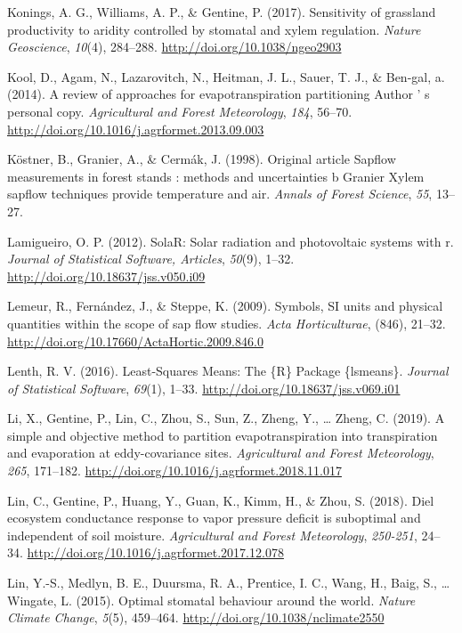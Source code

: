 \documentclass[11pt,twoside]{reedthesis}
\begin{document}
\hypertarget{ref-Konings2017}{}
Konings, A. G., Williams, A. P., \& Gentine, P. (2017). Sensitivity of
grassland productivity to aridity controlled by stomatal and xylem
regulation. \emph{Nature Geoscience}, \emph{10}(4), 284--288.
\url{http://doi.org/10.1038/ngeo2903}

\hypertarget{ref-Kool2014}{}
Kool, D., Agam, N., Lazarovitch, N., Heitman, J. L., Sauer, T. J., \&
Ben-gal, a. (2014). A review of approaches for evapotranspiration
partitioning Author ' s personal copy. \emph{Agricultural and Forest
Meteorology}, \emph{184}, 56--70.
\url{http://doi.org/10.1016/j.agrformet.2013.09.003}

\hypertarget{ref-Kostner1998}{}
Köstner, B., Granier, A., \& Cermák, J. (1998). Original article Sapflow
measurements in forest stands : methods and uncertainties b Granier
Xylem sapflow techniques provide temperature and air. \emph{Annals of
Forest Science}, \emph{55}, 13--27.

\hypertarget{ref-perpinan2012}{}
Lamigueiro, O. P. (2012). SolaR: Solar radiation and photovoltaic
systems with r. \emph{Journal of Statistical Software, Articles},
\emph{50}(9), 1--32. \url{http://doi.org/10.18637/jss.v050.i09}

\hypertarget{ref-lemeur2009}{}
Lemeur, R., Fernández, J., \& Steppe, K. (2009). Symbols, SI units and
physical quantities within the scope of sap flow studies. \emph{Acta
Horticulturae}, (846), 21--32.
\url{http://doi.org/10.17660/ActaHortic.2009.846.0}

\hypertarget{ref-Lenth2016}{}
Lenth, R. V. (2016). Least-Squares Means: The \{R\} Package \{lsmeans\}.
\emph{Journal of Statistical Software}, \emph{69}(1), 1--33.
\url{http://doi.org/10.18637/jss.v069.i01}

\hypertarget{ref-li_simple_2019}{}
Li, X., Gentine, P., Lin, C., Zhou, S., Sun, Z., Zheng, Y., \ldots{}
Zheng, C. (2019). A simple and objective method to partition
evapotranspiration into transpiration and evaporation at eddy-covariance
sites. \emph{Agricultural and Forest Meteorology}, \emph{265}, 171--182.
\url{http://doi.org/10.1016/j.agrformet.2018.11.017}

\hypertarget{ref-lin_diel_2018}{}
Lin, C., Gentine, P., Huang, Y., Guan, K., Kimm, H., \& Zhou, S. (2018).
Diel ecosystem conductance response to vapor pressure deficit is
suboptimal and independent of soil moisture. \emph{Agricultural and
Forest Meteorology}, \emph{250-251}, 24--34.
\url{http://doi.org/10.1016/j.agrformet.2017.12.078}

\hypertarget{ref-lin_optimal_2015}{}
Lin, Y.-S., Medlyn, B. E., Duursma, R. A., Prentice, I. C., Wang, H.,
Baig, S., \ldots{} Wingate, L. (2015). Optimal stomatal behaviour around
the world. \emph{Nature Climate Change}, \emph{5}(5), 459--464.
\url{http://doi.org/10.1038/nclimate2550}
\end{document}

